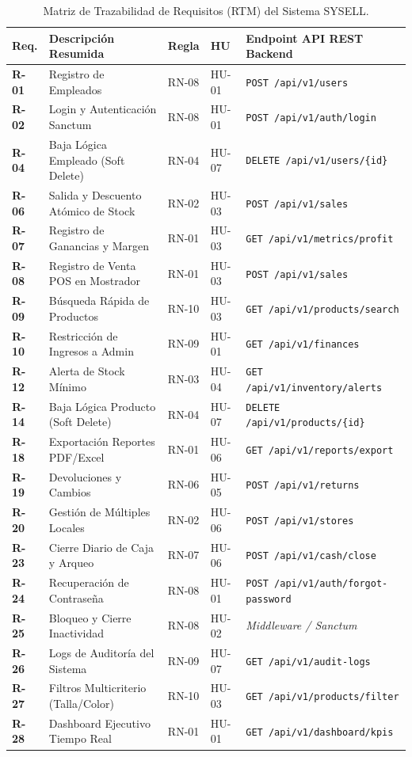 \begin{table}[H]
\centering
\scriptsize
\begin{tabularx}{\linewidth}{l>{\raggedright\arraybackslash}Xll>{\raggedright\arraybackslash}p{4.5cm}}
\toprule
\rowcolor{LightSlate}
\textbf{Req.} & \textbf{Descripción Resumida} & \textbf{Regla} & \textbf{HU} & \textbf{Endpoint API REST Backend} \\
\midrule
\textbf{R-01} & Registro de Empleados & RN-08 & HU-01 & \texttt{POST /api/v1/users} \\
\textbf{R-02} & Login y Autenticación Sanctum & RN-08 & HU-01 & \texttt{POST /api/v1/auth/login} \\
\textbf{R-04} & Baja Lógica Empleado (Soft Delete) & RN-04 & HU-07 & \texttt{DELETE /api/v1/users/\{id\}} \\
\textbf{R-06} & Salida y Descuento Atómico de Stock & RN-02 & HU-03 & \texttt{POST /api/v1/sales} \\
\textbf{R-07} & Registro de Ganancias y Margen & RN-01 & HU-03 & \texttt{GET /api/v1/metrics/profit} \\
\textbf{R-08} & Registro de Venta POS en Mostrador & RN-01 & HU-03 & \texttt{POST /api/v1/sales} \\
\textbf{R-09} & Búsqueda Rápida de Productos & RN-10 & HU-03 & \texttt{GET /api/v1/products/search} \\
\textbf{R-10} & Restricción de Ingresos a Admin & RN-09 & HU-01 & \texttt{GET /api/v1/finances} \\
\textbf{R-12} & Alerta de Stock Mínimo & RN-03 & HU-04 & \texttt{GET /api/v1/inventory/alerts} \\
\textbf{R-14} & Baja Lógica Producto (Soft Delete) & RN-04 & HU-07 & \texttt{DELETE /api/v1/products/\{id\}} \\
\textbf{R-18} & Exportación Reportes PDF/Excel & RN-01 & HU-06 & \texttt{GET /api/v1/reports/export} \\
\textbf{R-19} & Devoluciones y Cambios & RN-06 & HU-05 & \texttt{POST /api/v1/returns} \\
\textbf{R-20} & Gestión de Múltiples Locales & RN-02 & HU-06 & \texttt{POST /api/v1/stores} \\
\textbf{R-23} & Cierre Diario de Caja y Arqueo & RN-07 & HU-06 & \texttt{POST /api/v1/cash/close} \\
\textbf{R-24} & Recuperación de Contraseña & RN-08 & HU-01 & \texttt{POST /api/v1/auth/forgot-password} \\
\textbf{R-25} & Bloqueo y Cierre Inactividad & RN-08 & HU-02 & \textit{Middleware / Sanctum} \\
\textbf{R-26} & Logs de Auditoría del Sistema & RN-09 & HU-07 & \texttt{GET /api/v1/audit-logs} \\
\textbf{R-27} & Filtros Multicriterio (Talla/Color) & RN-10 & HU-03 & \texttt{GET /api/v1/products/filter} \\
\textbf{R-28} & Dashboard Ejecutivo Tiempo Real & RN-01 & HU-01 & \texttt{GET /api/v1/dashboard/kpis} \\
\bottomrule
\end{tabularx}
\caption{Matriz de Trazabilidad de Requisitos (RTM) del Sistema SYSELL.}
\label{tab:matriz_trazabilidad}
\end{table}
